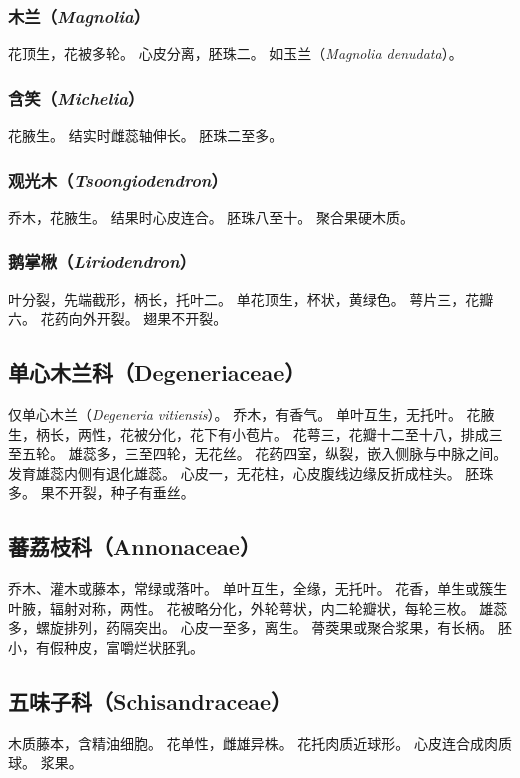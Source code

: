 \documentclass[11pt]{article}
\begin{document}
\begin{sloppypar}
\subsubsection{木兰（\textit{Magnolia}）}
花顶生，花被多轮。
心皮分离，胚珠二。
如玉兰（\textit{Magnolia denudata}）。

\subsubsection{含笑（\textit{Michelia}）}
花腋生。
结实时雌蕊轴伸长。
胚珠二至多。

\subsubsection{观光木（\textit{Tsoongiodendron}）}
乔木，花腋生。
结果时心皮连合。
胚珠八至十。
聚合果硬木质。

\subsubsection{鹅掌楸（\textit{Liriodendron}）}
叶分裂，先端截形，柄长，托叶二。
单花顶生，杯状，黄绿色。
萼片三，花瓣六。
花药向外开裂。
翅果不开裂。

\subsection{单心木兰科（Degeneriaceae）}
仅单心木兰（\textit{Degeneria vitiensis}）。
乔木，有香气。
单叶互生，无托叶。
花腋生，柄长，两性，花被分化，花下有小苞片。
花萼三，花瓣十二至十八，排成三至五轮。
雄蕊多，三至四轮，无花丝。
花药四室，纵裂，嵌入侧脉与中脉之间。
发育雄蕊内侧有退化雄蕊。
心皮一，无花柱，心皮腹线边缘反折成柱头。
胚珠多。
果不开裂，种子有垂丝。

\subsection{蕃荔枝科（Annonaceae）}
乔木、灌木或藤本，常绿或落叶。
单叶互生，全缘，无托叶。
花香，单生或簇生叶腋，辐射对称，两性。
花被略分化，外轮萼状，内二轮瓣状，每轮三枚。
雄蕊多，螺旋排列，药隔突出。
心皮一至多，离生。
蓇葖果或聚合浆果，有长柄。
胚小，有假种皮，富嚼烂状胚乳。

\subsection{五味子科（Schisandraceae）}
木质藤本，含精油细胞。
花单性，雌雄异株。
花托肉质近球形。
心皮连合成肉质球。
浆果。


\end{sloppypar}
\end{document}

